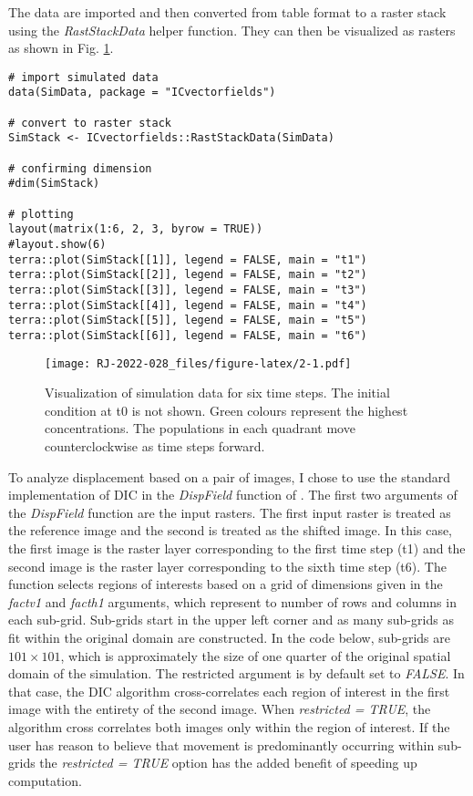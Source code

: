 The data are imported and then converted from table format to a raster stack using the \emph{RastStackData} helper function. They can then be visualized as rasters as shown in Fig. \ref{fig:2}.

\begin{verbatim}
# import simulated data
data(SimData, package = "ICvectorfields")

# convert to raster stack
SimStack <- ICvectorfields::RastStackData(SimData)

# confirming dimension
#dim(SimStack)

# plotting
layout(matrix(1:6, 2, 3, byrow = TRUE))
#layout.show(6)
terra::plot(SimStack[[1]], legend = FALSE, main = "t1")
terra::plot(SimStack[[2]], legend = FALSE, main = "t2")
terra::plot(SimStack[[3]], legend = FALSE, main = "t3")
terra::plot(SimStack[[4]], legend = FALSE, main = "t4")
terra::plot(SimStack[[5]], legend = FALSE, main = "t5")
terra::plot(SimStack[[6]], legend = FALSE, main = "t6")
\end{verbatim}

\begin{figure}
\centering
\texttt{[image: RJ-2022-028\_files/figure-latex/2-1.pdf]}
\caption{\label{fig:2}Visualization of simulation data for six time steps. The initial condition at t0 is not shown. Green colours represent the highest concentrations. The populations in each quadrant move counterclockwise as time steps forward.}
\end{figure}

To analyze displacement based on a pair of images, I chose to use the standard implementation of DIC in the
\emph{DispField} function of . The first two arguments of the \emph{DispField} function are the input rasters. The first input raster is treated as the reference image and the second is treated as the shifted image. In this case, the first image is the raster layer corresponding to the first time step (t1) and the second image is the raster layer corresponding to the sixth time step (t6). The function selects regions of interests based on a grid of dimensions given in the \emph{factv1} and \emph{facth1} arguments, which represent to number of rows and columns in each sub-grid. Sub-grids start in the upper left corner and as many sub-grids as fit within the original domain are constructed. In the code below, sub-grids are \(101 \times 101\), which is approximately the size of one quarter of the original spatial domain of the simulation. The restricted argument is by default set to \emph{FALSE}. In that case, the DIC algorithm cross-correlates each region of interest in the first image with the entirety of the second image. When \emph{restricted = TRUE}, the algorithm cross correlates both images only within the region of interest. If the user has reason to believe that movement is predominantly occurring within sub-grids the \emph{restricted = TRUE} option has the added benefit of speeding up computation.

